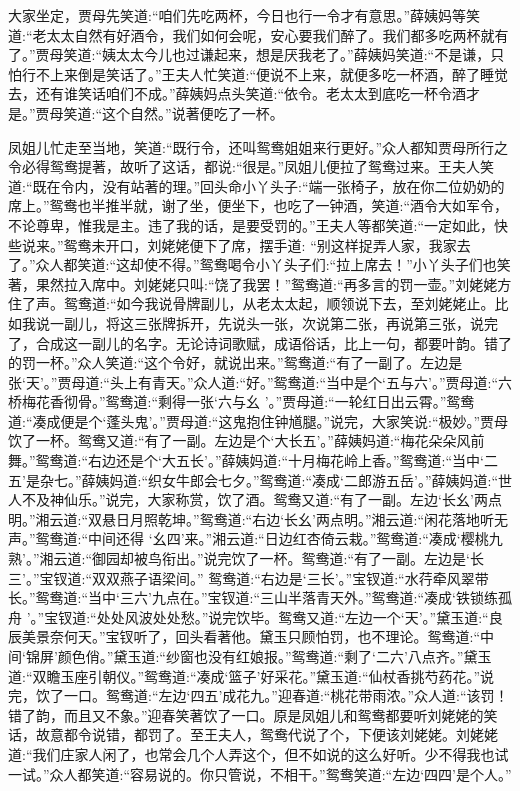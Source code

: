\begin{parag}
    大家坐定，贾母先笑道:“咱们先吃两杯，今日也行一令才有意思。”薛姨妈等笑道:“老太太自然有好酒令，我们如何会呢，安心要我们醉了。我们都多吃两杯就有了。”贾母笑道:“姨太太今儿也过谦起来，想是厌我老了。”薛姨妈笑道:“不是谦，只怕行不上来倒是笑话了。”王夫人忙笑道:“便说不上来，就便多吃一杯酒，醉了睡觉去，还有谁笑话咱们不成。”薛姨妈点头笑道:“依令。老太太到底吃一杯令酒才是。”贾母笑道:“这个自然。”说著便吃了一杯。
\end{parag}


\begin{parag}
    凤姐儿忙走至当地，笑道:“既行令，还叫鸳鸯姐姐来行更好。”众人都知贾母所行之令必得鸳鸯提著，故听了这话，都说:“很是。”凤姐儿便拉了鸳鸯过来。王夫人笑道:“既在令内，没有站著的理。”回头命小丫头子:“端一张椅子，放在你二位奶奶的席上。”鸳鸯也半推半就，谢了坐，便坐下，也吃了一钟酒，笑道:“酒令大如军令，不论尊卑，惟我是主。违了我的话，是要受罚的。”王夫人等都笑道:“一定如此，快些说来。”鸳鸯未开口，刘姥姥便下了席，摆手道: “别这样捉弄人家，我家去了。”众人都笑道:“这却使不得。”鸳鸯喝令小丫头子们:“拉上席去！”小丫头子们也笑著，果然拉入席中。刘姥姥只叫:“饶了我罢！”鸳鸯道:“再多言的罚一壶。”刘姥姥方住了声。鸳鸯道:“如今我说骨牌副儿，从老太太起，顺领说下去，至刘姥姥止。比如我说一副儿，将这三张牌拆开，先说头一张，次说第二张，再说第三张，说完了，合成这一副儿的名字。无论诗词歌赋，成语俗话，比上一句，都要叶韵。错了的罚一杯。”众人笑道:“这个令好，就说出来。”鸳鸯道:“有了一副了。左边是张‘天’。”贾母道:“头上有青天。”众人道:“好。”鸳鸯道:“当中是个‘五与六’。”贾母道:“六桥梅花香彻骨。”鸳鸯道:“剩得一张‘六与幺 ’。”贾母道:“一轮红日出云霄。”鸳鸯道:“凑成便是个‘蓬头鬼’。”贾母道:“这鬼抱住钟馗腿。”说完，大家笑说:“极妙。”贾母饮了一杯。鸳鸯又道:“有了一副。左边是个‘大长五’。”薛姨妈道:“梅花朵朵风前舞。”鸳鸯道:“右边还是个‘大五长’。”薛姨妈道:“十月梅花岭上香。”鸳鸯道:“当中‘二五’是杂七。”薛姨妈道:“织女牛郎会七夕。”鸳鸯道:“凑成‘二郎游五岳’。”薛姨妈道:“世人不及神仙乐。”说完，大家称赏，饮了酒。鸳鸯又道:“有了一副。左边‘长幺’两点明。”湘云道:“双悬日月照乾坤。”鸳鸯道:“右边‘长幺’两点明。”湘云道:“闲花落地听无声。”鸳鸯道:“中间还得 ‘幺四’来。”湘云道:“日边红杏倚云栽。”鸳鸯道:“凑成‘樱桃九熟’。”湘云道:“御园却被鸟衔出。”说完饮了一杯。鸳鸯道:“有了一副。左边是‘长三’。”宝钗道:“双双燕子语梁间。” 鸳鸯道:“右边是‘三长’。”宝钗道:“水荇牵风翠带长。”鸳鸯道:“当中‘三六’九点在。”宝钗道:“三山半落青天外。”鸳鸯道:“凑成‘铁锁练孤舟 ’。”宝钗道:“处处风波处处愁。”说完饮毕。鸳鸯又道:“左边一个‘天’。”黛玉道:“良辰美景奈何天。”宝钗听了，回头看著他。黛玉只顾怕罚，也不理论。鸳鸯道:“中间‘锦屏’颜色俏。”黛玉道:“纱窗也没有红娘报。”鸳鸯道:“剩了‘二六’八点齐。”黛玉道:“双瞻玉座引朝仪。”鸳鸯道:“凑成‘篮子’好采花。”黛玉道:“仙杖香挑芍药花。”说完，饮了一口。鸳鸯道:“左边‘四五’成花九。”迎春道:“桃花带雨浓。”众人道:“该罚！错了韵，而且又不象。”迎春笑著饮了一口。原是凤姐儿和鸳鸯都要听刘姥姥的笑话，故意都令说错，都罚了。至王夫人，鸳鸯代说了个，下便该刘姥姥。刘姥姥道:“我们庄家人闲了，也常会几个人弄这个，但不如说的这么好听。少不得我也试一试。”众人都笑道:“容易说的。你只管说，不相干。”鸳鸯笑道:“左边‘四四’是个人。” 
\end{parag}
